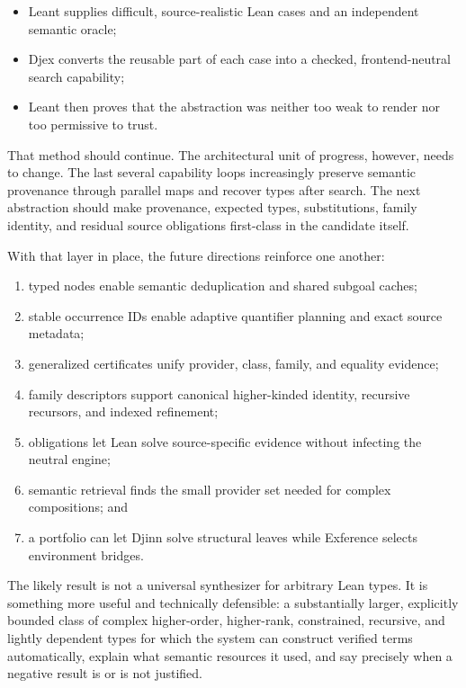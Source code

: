 \documentclass[11pt]{article}
\newcommand{\Djex}{\textsf{Djex}}
\newcommand{\Leant}{\textsf{Leant}}
\newcommand{\Djinn}{Djinn}
\newcommand{\Exference}{Exference}
\begin{document}
\begin{itemize}
  \item \Leant{} supplies difficult, source-realistic Lean cases and an
    independent semantic oracle;
  \item \Djex{} converts the reusable part of each case into a checked,
    frontend-neutral search capability;
  \item \Leant{} then proves that the abstraction was neither too weak to render
    nor too permissive to trust.
\end{itemize}

That method should continue.  The architectural unit of progress, however,
needs to change.  The last several capability loops increasingly preserve
semantic provenance through parallel maps and recover types after search.  The
next abstraction should make provenance, expected types, substitutions,
family identity, and residual source obligations first-class in the candidate
itself.

With that layer in place, the future directions reinforce one another:

\begin{enumerate}
  \item typed nodes enable semantic deduplication and shared subgoal caches;
  \item stable occurrence IDs enable adaptive quantifier planning and exact
    source metadata;
  \item generalized certificates unify provider, class, family, and equality
    evidence;
  \item family descriptors support canonical higher-kinded identity, recursive
    recursors, and indexed refinement;
  \item obligations let Lean solve source-specific evidence without infecting
    the neutral engine;
  \item semantic retrieval finds the small provider set needed for complex
    compositions; and
  \item a portfolio can let \Djinn{} solve structural leaves while
    \Exference{} selects environment bridges.
\end{enumerate}

The likely result is not a universal synthesizer for arbitrary Lean types.
It is something more useful and technically defensible: a substantially larger,
explicitly bounded class of complex higher-order, higher-rank, constrained,
recursive, and lightly dependent types for which the system can construct
verified terms automatically, explain what semantic resources it used, and say
precisely when a negative result is or is not justified.
\end{document}
